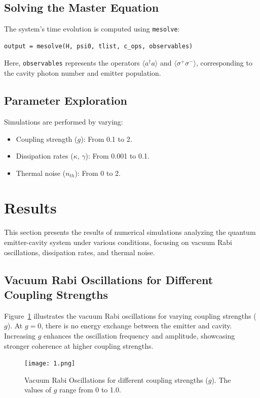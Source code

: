 \documentclass[conference]{IEEEtran}
\begin{document}
\subsection{Solving the Master Equation}
The system's time evolution is computed using \texttt{mesolve}:
{\scriptsize
\begin{verbatim}
output = mesolve(H, psi0, tlist, c_ops, observables)
\end{verbatim}
}
Here, \texttt{observables} represents the operators $\langle a^\dagger a \rangle$ and $\langle \sigma^+ \sigma^- \rangle$, corresponding to the cavity photon number and emitter population.


\subsection{Parameter Exploration}
Simulations are performed by varying:
\begin{itemize}
    \item Coupling strength ($g$): From 0.1 to 2.
    \item Dissipation rates ($\kappa$, $\gamma$): From 0.001 to 0.1.
    \item Thermal noise ($n_{th}$): From 0 to 2.
\end{itemize}


\section{Results}

This section presents the results of numerical simulations analyzing the quantum emitter-cavity system under various conditions, focusing on vacuum Rabi oscillations, dissipation rates, and thermal noise.

\subsection{Vacuum Rabi Oscillations for Different Coupling Strengths}

Figure~\ref{fig:coupling_strength} illustrates the vacuum Rabi oscillations for varying coupling strengths ($g$). At $g = 0$, there is no energy exchange between the emitter and cavity. Increasing $g$ enhances the oscillation frequency and amplitude, showcasing stronger coherence at higher coupling strengths.

\begin{figure}[h!]
    \centering
    \texttt{[image: 1.png]}
    \caption{Vacuum Rabi Oscillations for different coupling strengths ($g$). The values of $g$ range from 0 to 1.0.}
    \label{fig:coupling_strength}
\end{figure}
\end{document}
